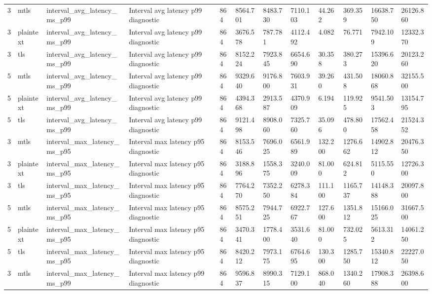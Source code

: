 \begin{longtable}{llllllllllll}
3 & mtls & interval\_avg\_latency\_ms\_p99 & Interval avg latency p99 diagnostic & 864 & 8564.701 & 8483.730 & 7110.103 & 44.262 & 369.359 & 16638.750 & 26126.860 \\
3 & plaintext & interval\_avg\_latency\_ms\_p99 & Interval avg latency p99 diagnostic & 864 & 3676.578 & 787.781 & 4112.492 & 4.082 & 76.771 & 7942.109 & 12332.370 \\
3 & tls & interval\_avg\_latency\_ms\_p99 & Interval avg latency p99 diagnostic & 864 & 8152.224 & 7923.845 & 6654.690 & 30.358 & 380.273 & 15396.620 & 20123.260 \\
5 & mtls & interval\_avg\_latency\_ms\_p99 & Interval avg latency p99 diagnostic & 864 & 9329.640 & 9176.800 & 7603.931 & 39.260 & 431.508 & 18060.868 & 32155.500 \\
5 & plaintext & interval\_avg\_latency\_ms\_p99 & Interval avg latency p99 diagnostic & 864 & 4394.368 & 2913.587 & 4370.909 & 6.194 & 119.925 & 9541.503 & 13154.795 \\
5 & tls & interval\_avg\_latency\_ms\_p99 & Interval avg latency p99 diagnostic & 864 & 9121.498 & 8908.060 & 7325.760 & 35.096 & 478.800 & 17562.458 & 21524.352 \\
3 & mtls & interval\_max\_latency\_ms\_p95 & Interval max latency p95 diagnostic & 864 & 8153.546 & 7696.025 & 6561.989 & 132.200 & 1276.662 & 14902.812 & 20476.350 \\
3 & plaintext & interval\_max\_latency\_ms\_p95 & Interval max latency p95 diagnostic & 864 & 3188.896 & 1558.375 & 3240.009 & 81.000 & 624.812 & 5115.550 & 12726.300 \\
3 & tls & interval\_max\_latency\_ms\_p95 & Interval max latency p95 diagnostic & 864 & 7764.270 & 7352.250 & 6278.384 & 111.100 & 1165.737 & 14148.388 & 20097.800 \\
5 & mtls & interval\_max\_latency\_ms\_p95 & Interval max latency p95 diagnostic & 864 & 8575.251 & 7944.725 & 6922.767 & 127.600 & 1351.812 & 15166.025 & 31667.500 \\
5 & plaintext & interval\_max\_latency\_ms\_p95 & Interval max latency p95 diagnostic & 864 & 3470.341 & 1778.400 & 3531.640 & 81.000 & 732.025 & 5613.312 & 14061.250 \\
5 & tls & interval\_max\_latency\_ms\_p95 & Interval max latency p95 diagnostic & 864 & 8420.212 & 7973.175 & 6764.695 & 130.300 & 1285.750 & 15340.812 & 22227.050 \\
3 & mtls & interval\_max\_latency\_ms\_p99 & Interval max latency p99 diagnostic & 864 & 9596.837 & 8990.315 & 7129.100 & 868.040 & 1340.260 & 17908.388 & 26398.600 \\

\end{longtable}
